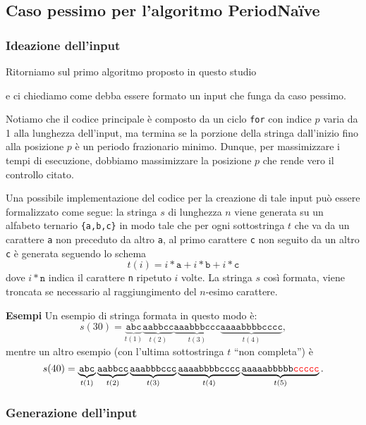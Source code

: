 \documentclass[11pt,a4paper,italian]{article}
\begin{document}
\subsection{Caso pessimo per l'algoritmo PeriodNa{\"i}ve}

\subsubsection{Ideazione dell'input}
Ritorniamo sul primo algoritmo proposto in questo studio
 
e ci chiediamo come debba essere formato un input che funga da caso pessimo.

Notiamo che il codice principale è composto da un ciclo \texttt{for} con indice $p$ varia da 1 alla lunghezza dell'input, ma termina se la porzione della stringa dall'inizio fino alla posizione $p$ è un periodo frazionario minimo. Dunque, per massimizzare i tempi di esecuzione, dobbiamo massimizzare la posizione $p$ che rende vero il controllo citato.

Una possibile implementazione del codice per la creazione di tale input può essere formalizzato come segue: la stringa $s$ di lunghezza $n$ viene generata su un alfabeto ternario \texttt{\{a,b,c\}} in modo tale che per ogni sottostringa $t$ che va da un carattere \texttt{a} non preceduto da altro \texttt{a}, al primo carattere \texttt{c} non seguito da un altro \texttt{c} è generata seguendo lo schema
\begin{equation*}
t(i) = i*\texttt{a} + i*\texttt{b} + i*\texttt{c}
\end{equation*}
dove $i*\texttt{n}$ indica il carattere \texttt{n} ripetuto $i$ volte.
La stringa $s$ così formata, viene troncata se necessario al raggiungimento del $n$-esimo carattere.

\textbf{Esempi} Un esempio di stringa formata in questo modo è:
\begin{equation*}
s(30) = \underbrace{\texttt{abc}}_{t(1)} \underbrace{\texttt{aabbcc}}_{t(2)} \underbrace{\texttt{aaabbbccc}}_{t(3)} \underbrace{\texttt{aaaabbbbcccc}}_{t(4)},
\end{equation*}
mentre un altro esempio (con l'ultima sottostringa $t$ ``non completa'') è
\begin{equation*}
s(40) = \underbrace{\texttt{abc}}_{t(1)} \underbrace{\texttt{aabbcc}}_{t(2)} \underbrace{\texttt{aaabbbccc}}_{t(3)} \underbrace{\texttt{aaaabbbbcccc}}_{t(4)} \underbrace{\texttt{aaaaabbbbb\textcolor{red}{ccccc}}}_{t(5)}.
\end{equation*}


\subsubsection{Generazione dell'input}
\end{document}
